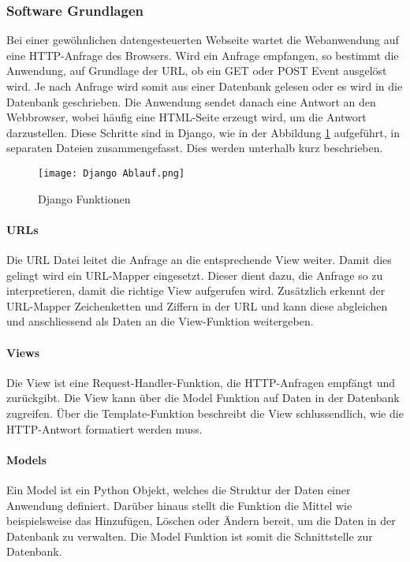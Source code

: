 \subsubsection{Software Grundlagen}\label{subsubsec:SoftwareGrundlagen}
Bei einer gewöhnlichen datengesteuerten Webseite wartet die Webanwendung auf eine HTTP-Anfrage des Browsers.
Wird ein Anfrage empfangen, so bestimmt die Anwendung, auf Grundlage der URL, ob ein GET oder POST Event ausgelöst wird.
Je nach Anfrage wird somit aus einer Datenbank gelesen oder es wird in die Datenbank geschrieben.
Die Anwendung sendet danach eine Antwort an den Webbrowser, wobei häufig eine HTML-Seite erzeugt wird, um die Antwort darzustellen. Diese Schritte sind in Django, wie in der Abbildung \ref{fig:DjangoAblauf} aufgeführt, in separaten Dateien zusammengefasst. Dies werden unterhalb kurz beschrieben.

\begin{figure} [H]
	\centering
	\texttt{[image: Django Ablauf.png]}
	\caption{Django Funktionen \cite{mdn_web_docs_django_2019}}
	\label{fig:DjangoAblauf}
\end{figure}

\paragraph{URLs}
Die URL Datei leitet die Anfrage an die entsprechende View weiter. Damit dies gelingt wird ein URL-Mapper eingesetzt.
Dieser dient dazu, die Anfrage so zu interpretieren, damit die richtige View aufgerufen wird.
Zusätzlich erkennt der URL-Mapper Zeichenketten und Ziffern in der URL und kann diese abgleichen und anschliessend als Daten an die View-Funktion weitergeben.

\paragraph{Views}
Die View ist eine Request-Handler-Funktion, die HTTP-Anfragen empfängt und zurückgibt.
Die View kann über die Model Funktion auf Daten in der Datenbank zugreifen.
Über die Template-Funktion beschreibt die View schlussendlich, wie die HTTP-Antwort formatiert werden muss.

\paragraph{Models}
Ein Model ist ein Python Objekt, welches die Struktur der Daten einer Anwendung definiert. Darüber hinaus stellt die Funktion die Mittel wie beispielsweise das Hinzufügen, Löschen oder Ändern bereit, um die Daten in der Datenbank zu verwalten.
Die Model Funktion ist somit die Schnittstelle zur Datenbank.


